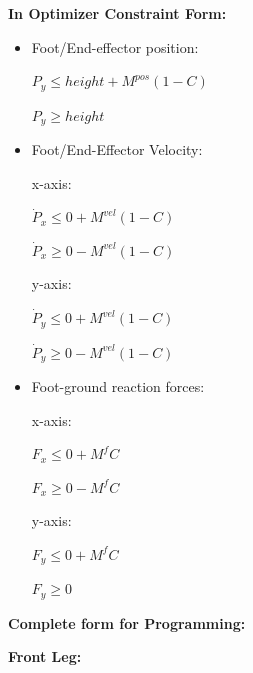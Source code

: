 \documentclass[a4paper,10pt]{article}
\begin{document}
\vspace{3mm}

\textbf{In Optimizer Constraint Form:}

\begin{itemize}
	\item Foot/End-effector position:
	
	$P_y \leq height + M^{pos}(1-C)$
	
	$P_y \geq height$
	
	\item Foot/End-Effector Velocity:
	
	x-axis:
	
	$\dot{P}_x \leq 0 + M^{vel}(1-C)$
	
	$\dot{P}_x \geq 0 - M^{vel}(1-C)$
	
	y-axis:
	
	$\dot{P}_y \leq 0 + M^{vel}(1-C)$
	
	$\dot{P}_y \geq 0 - M^{vel}(1-C)$
	
	\item Foot-ground reaction forces:
	
	x-axis:
	
	$F_x \leq 0 + M^fC$
	
	$F_x \geq 0 - M^fC$
	
	y-axis:
	
	$F_y \leq 0 + M^fC$
	
	$F_y \geq 0$
	
\end{itemize}

\vspace{3mm}

\textbf{Complete form for Programming:}

\textbf{Front Leg:}
\end{document}
